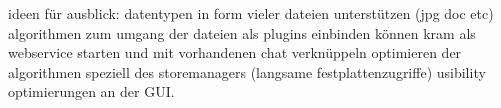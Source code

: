 ideen für ausblick:\newline
datentypen in form vieler dateien unterstützen (jpg doc etc) \newline
algorithmen zum umgang der dateien als plugins einbinden können \newline
kram als webservice starten und mit vorhandenen chat verknüppeln \newline
optimieren der algorithmen speziell des storemanagers (langsame
festplattenzugriffe) \newline
usibility optimierungen an der GUI.





%
%


